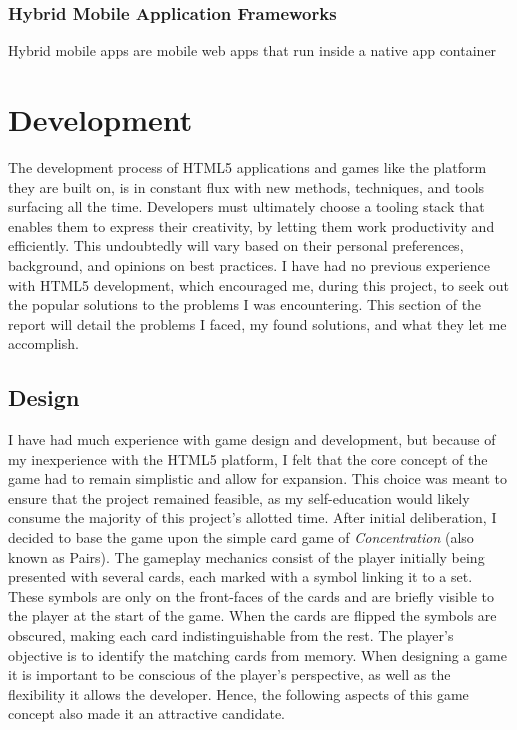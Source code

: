 \documentclass[final]{cmpreport}
\begin{document}

\subsubsection{Hybrid Mobile Application Frameworks}
Hybrid mobile apps are mobile web apps that run inside a native app container

\section{Development}
\label{sec:dev}
The development process of HTML5 applications and games like the platform they are built on, is in constant flux with new methods, techniques, and tools surfacing all the time. Developers must ultimately choose a tooling stack that enables them to express their creativity, by letting them work productivity and efficiently. This undoubtedly will vary based on their personal preferences, background, and opinions on best practices. I have had no previous experience with HTML5 development, which encouraged me, during this project, to seek out the popular solutions to the problems I was encountering. This section of the report will detail the problems I faced, my found solutions, and what they let me accomplish. 

\subsection{Design}
I have had much experience with game design and development, but because of my inexperience with the HTML5 platform, I felt that the core concept of the game had to remain simplistic and allow for expansion. This choice was meant to ensure that the project remained feasible, as my self-education would likely consume the majority of this project's allotted time. After initial deliberation, I decided to base the game upon the simple card game of \textit{Concentration\footnotemark} (also known as Pairs). The gameplay mechanics consist of the player initially being presented with several cards, each marked with a symbol linking it to a set. These symbols are only on the front-faces of the cards and are briefly visible to the player at the start of the game. When the cards are flipped the symbols are obscured, making each card indistinguishable from the rest. The player's objective is to identify the matching cards from memory. When designing a game it is important to be conscious of the player's perspective, as well as the flexibility it allows the developer. Hence, the following aspects of this game concept also made it an attractive candidate.
\end{document}
